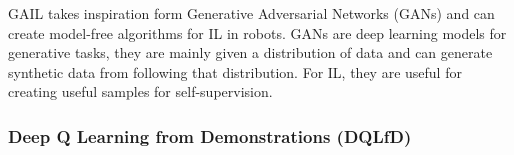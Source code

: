 GAIL \cite{ho2016generativeadversarialimitationlearning}  takes inspiration form Generative Adversarial Networks (GANs) \cite{goodfellow2014generativeadversarialnetworks} and can create model-free algorithms for IL in robots. GANs are deep learning models for generative tasks, they are mainly given a distribution of data and can generate synthetic data from following that distribution. For IL, they are useful for creating useful samples for self-supervision.

\subsubsection{Deep Q Learning from Demonstrations (DQLfD)}

